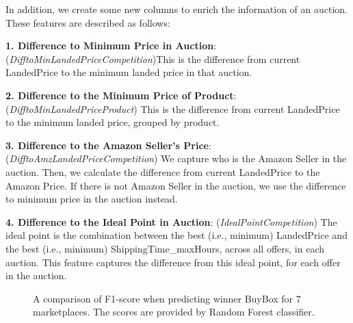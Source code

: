 In addition, we create some new columns to enrich the information of an auction. These features are described as follows:

\textbf{1. Difference to Minimum Price in Auction}: (\textit{DifftoMinLandedPriceCompetition})This is the difference from current LandedPrice to the minimum landed price in that auction.

\textbf{2. Difference to the Minimum Price of Product}: (\textit{DifftoMinLandedPriceProduct}) This is the difference from current LandedPrice to the minimum landed price, grouped by product.

\textbf{3. Difference to the Amazon Seller's Price}: (\textit{DifftoAmzLandedPriceCompetition}) We capture who is the Amazon Seller in the auction. Then, we calculate the difference from current LandedPrice to the Amazon Price. If there is not Amazon Seller in the auction, we use the difference to minimum price in the auction instead.

\textbf{4. Difference to the Ideal Point in Auction}: (\textit{IdealPointCompetition}) The ideal point is the combination between the best (i.e., minimum) LandedPrice and the best (i.e., minimum) ShippingTime\_maxHours, across all offers, in each auction. This feature captures the difference from this ideal point, for each offer in the auction.
\begin{figure}[!h]
	\begin{center}
	\end{center}
	\caption{\label{fig:addfeaures}A comparison of F1-score when predicting winner BuyBox for 7 marketplaces. The scores are provided by Random Forest classifier.}
\end{figure}

